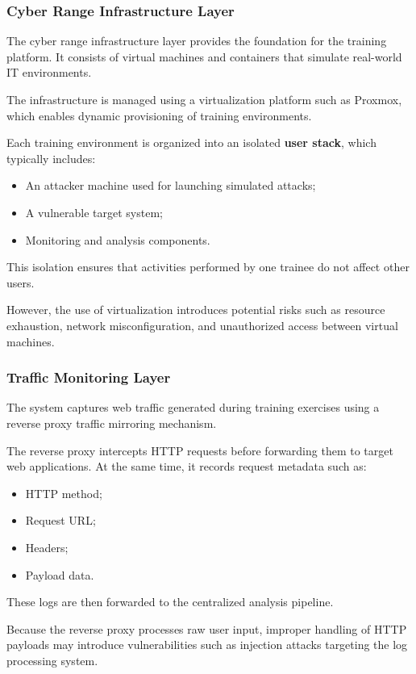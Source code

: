 \subsubsection{Cyber Range Infrastructure Layer}
The cyber range infrastructure layer provides the foundation for the training platform. It consists of virtual machines and containers that simulate real-world IT environments.

The infrastructure is managed using a virtualization platform such as Proxmox, which enables dynamic provisioning of training environments.

Each training environment is organized into an isolated \textbf{user stack}, which typically includes:
\begin{itemize}
    \item An attacker machine used for launching simulated attacks;
    \item A vulnerable target system;
    \item Monitoring and analysis components.
\end{itemize}
This isolation ensures that activities performed by one trainee do not affect other users.

However, the use of virtualization introduces potential risks such as resource exhaustion, network misconfiguration, and unauthorized access between virtual machines.

\subsubsection{Traffic Monitoring Layer}
The system captures web traffic generated during training exercises using a reverse proxy traffic mirroring mechanism.

The reverse proxy intercepts HTTP requests before forwarding them to target web applications. At the same time, it records request metadata such as:
\begin{itemize}
    \item HTTP method;
    \item Request URL;
    \item Headers;
    \item Payload data.
\end{itemize}
These logs are then forwarded to the centralized analysis pipeline.

Because the reverse proxy processes raw user input, improper handling of HTTP payloads may introduce vulnerabilities such as injection attacks targeting the log processing system.

